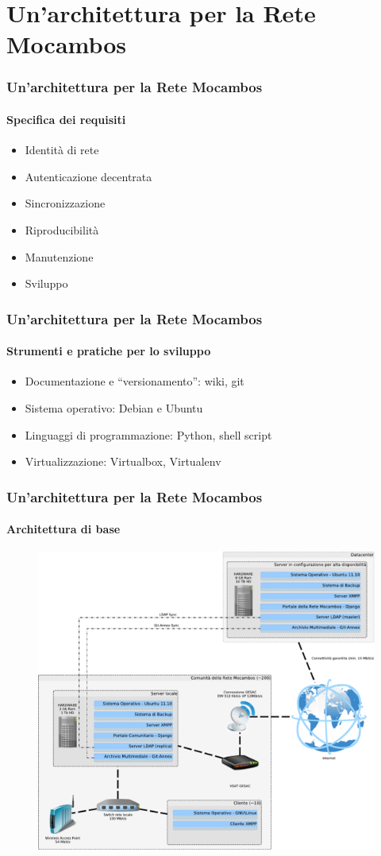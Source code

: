 \documentclass{beamer}
\begin{document}
\section{Un'architettura per la Rete Mocambos}

\begin{frame}
  \frametitle{Un'architettura per la Rete Mocambos}
  \framesubtitle{Specifica dei requisiti}
  \begin{itemize}
    \item Identità di rete
    \item Autenticazione decentrata
    \item Sincronizzazione
    \item Riproducibilità
    \item Manutenzione
    \item Sviluppo
    \end{itemize}

\end{frame}

\begin{frame}
  \frametitle{Un'architettura per la Rete Mocambos}
  \framesubtitle{Strumenti e pratiche per lo sviluppo}
  \begin{itemize}
    \item Documentazione e ``versionamento'': wiki, git
    \item Sistema operativo: Debian e Ubuntu
    \item Linguaggi di programmazione: Python, shell script
    \item Virtualizzazione: Virtualbox, Virtualenv
    \end{itemize}

\end{frame}

\begin{frame}
  \frametitle{Un'architettura per la Rete Mocambos}
  \framesubtitle{Architettura di base}
	\begin{figure}
		\includegraphics[height=0.7\textheight]{./Figure/SchemaServer_ReteMocambos-crop.pdf}
	\end{figure}


\end{frame}
\end{document}
